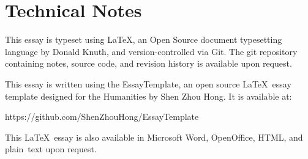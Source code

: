 
\section*{Technical Notes}
This essay is typeset using \LaTeX, an Open Source document typesetting language
by Donald Knuth, and version-controlled via Git. The git repository containing notes, source code, and revision history is available upon request.


\noindent
This essay is written using the EssayTemplate, an open source \LaTeX\ essay
template designed for the Humanities by Shen Zhou Hong. It is available at:

https://github.com/ShenZhouHong/EssayTemplate

\vfill
\begin{center}
This \LaTeX\ essay is also available in Microsoft Word, OpenOffice, HTML, and \mbox{plain text} upon request.
\end{center}
